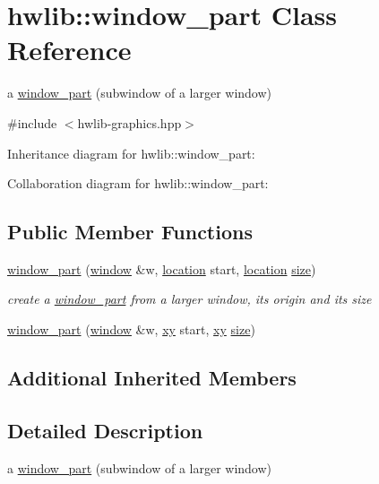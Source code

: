 \hypertarget{classhwlib_1_1window__part}{}\section{hwlib\+:\+:window\+\_\+part Class Reference}
\label{classhwlib_1_1window__part}


a \hyperlink{classhwlib_1_1window__part}{window\+\_\+part} (subwindow of a larger window)  




{\ttfamily \#include $<$hwlib-\/graphics.\+hpp$>$}



Inheritance diagram for hwlib\+:\+:window\+\_\+part\+:


Collaboration diagram for hwlib\+:\+:window\+\_\+part\+:
\subsection*{Public Member Functions}
\begin{DoxyCompactItemize}
\item 
\hyperlink{classhwlib_1_1window__part_a61d5cdec717d38ea7e013259b6c68ab9}{window\+\_\+part} (\hyperlink{classhwlib_1_1window}{window} \&w, \hyperlink{classhwlib_1_1location}{location} start, \hyperlink{classhwlib_1_1location}{location} \hyperlink{classhwlib_1_1window_ad2ad5281c9c09d18010b19cb807d3eaa}{size})
\begin{DoxyCompactList}\small\item\em create a \hyperlink{classhwlib_1_1window__part}{window\+\_\+part} from a larger window, its origin and its size \end{DoxyCompactList}\item 
\hyperlink{classhwlib_1_1window__part_afd762274f11c9efaefc0faaebb271da4}{window\+\_\+part} (\hyperlink{classhwlib_1_1window}{window} \&w, \hyperlink{classhwlib_1_1xy}{xy} start, \hyperlink{classhwlib_1_1xy}{xy} \hyperlink{classhwlib_1_1window_ad2ad5281c9c09d18010b19cb807d3eaa}{size})
\end{DoxyCompactItemize}
\subsection*{Additional Inherited Members}


\subsection{Detailed Description}
a \hyperlink{classhwlib_1_1window__part}{window\+\_\+part} (subwindow of a larger window) 


